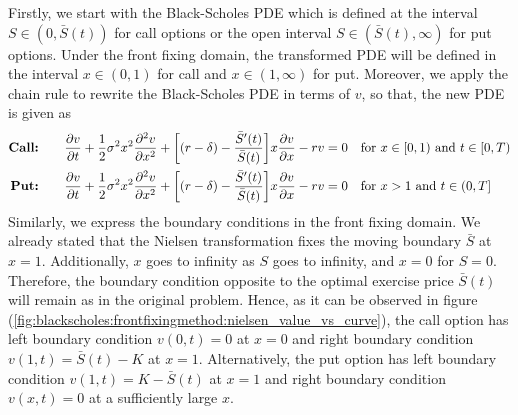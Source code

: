 Firstly, we start with the Black-Scholes PDE which is defined at the interval 
$S\in(0, \bar{S}(t))$ for call options or the open interval $S\in(\bar{S}(t), \infty)$ for put options. Under the front fixing domain, the transformed PDE will be defined in the interval $x\in(0, 1)$ for call and $x\in(1, \infty)$ for put. Moreover, we apply the chain rule to rewrite the Black-Scholes PDE in terms of $v$, so that, the new PDE is given as
\begin{subequations} \label{eq:blackscholes:frontfixingmethod:american_options_pde}
  \begin{align}
    \text{\textbf{Call:}} \qquad
    \dfrac{\partial{v}}{\partial{t}} + \dfrac{1}{2}\sigma^{2} x^2 \dfrac{\partial^2{v}}{\partial{x}^2} + \bigg[(r - \delta) - \dfrac{\bar{S}^\prime(t)}{\bar{S}(t)}\bigg]x\dfrac{\partial{v}}{\partial{x}} - rv = 0 \quad & \text{for $x \in [0, 1)$ and $t \in [0, T)$} \\
    \text{\textbf{Put:}} \qquad
    \dfrac{\partial{v}}{\partial{t}} + \dfrac{1}{2}\sigma^{2} x^2 \dfrac{\partial^2{v}}{\partial{x}^2} + \bigg[(r - \delta) - \dfrac{\bar{S}^\prime(t)}{\bar{S}(t)}\bigg]x\dfrac{\partial{v}}{\partial{x}} - rv = 0 \quad & \text{for $x > 1$ and $t \in (0, T]$}
  \end{align}
\end{subequations}
Similarly, we express the boundary conditions in the front fixing domain. We already stated that the Nielsen transformation fixes the moving boundary $\bar{S}$ at $x=1$. Additionally, $x$ goes to infinity as $S$ goes to infinity, and $x=0$ for $S=0$. Therefore, the boundary condition opposite to the optimal exercise price $\bar{S}(t)$ will remain as in the original problem. Hence,
as it can be observed in figure (\ref{fig:blackscholes:frontfixingmethod:nielsen_value_vs_curve}), the call option has left boundary condition $v(0, t) = 0$ at $x=0$ and right boundary condition $v(1, t) = \bar{S}(t) - K$ at $x=1$. Alternatively, 
the put option has left boundary condition $v(1, t) = K - \bar{S}(t)$ at $x=1$ and right boundary condition $v(x, t) = 0$ at a sufficiently large $x$.
